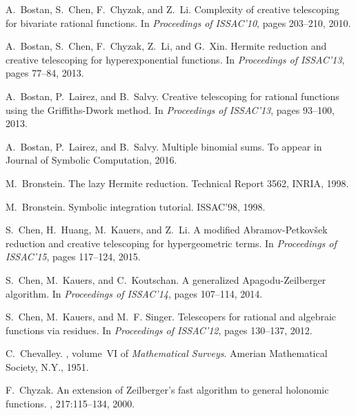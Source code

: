 \documentclass{sig-alternate-05-2015}
\begin{document}
\begin{thebibliography}{10}

A.~Bostan, S.~Chen, F.~Chyzak, and Z.~Li.
\newblock Complexity of creative telescoping for bivariate rational functions.
\newblock In {\em Proceedings of ISSAC'10}, pages 203--210, 2010.

A.~Bostan, S.~Chen, F.~Chyzak, Z.~Li, and G.~Xin.
\newblock Hermite reduction and creative telescoping for hyperexponential
  functions.
\newblock In {\em Proceedings of ISSAC'13}, pages 77--84, 2013.

A.~Bostan, P.~Lairez, and B.~Salvy.
\newblock Creative telescoping for rational functions using the
  {G}riffiths-{D}work method.
\newblock In {\em Proceedings of ISSAC'13}, pages 93--100, 2013.

A.~Bostan, P.~Lairez, and B.~Salvy.
\newblock Multiple binomial sums.
\newblock To appear in {J}ournal of {S}ymbolic {C}omputation, 2016.


M.~Bronstein.
\newblock The lazy {H}ermite reduction.
\newblock Technical Report 3562, INRIA, 1998.

M.~Bronstein.
\newblock Symbolic integration tutorial.
\newblock ISSAC'98, 1998.

S.~Chen, H.~Huang, M.~Kauers, and Z.~Li.
\newblock A modified {A}bramov-{P}etkov\v{s}ek reduction and creative
  telescoping for hypergeometric terms.
\newblock In {\em Proceedings of ISSAC'15}, pages 117--124, 2015.

 \vfill\eject
{}
S.~Chen, M.~Kauers, and C.~Koutschan.
\newblock A generalized {A}pagodu-{Z}eilberger algorithm.
\newblock In {\em Proceedings of ISSAC'14}, pages 107--114, 2014.

S.~Chen, M.~Kauers, and M.~F. Singer.
\newblock Telescopers for rational and algebraic functions via residues.
\newblock In {\em Proceedings of ISSAC'12}, pages 130--137, 2012.

C.~Chevalley.
, volume~VI of {\em Mathematical Surveys}.
\newblock Amerian Mathematical Society, N.Y., 1951.

F.~Chyzak.
\newblock An extension of {Z}eilberger's fast algorithm to general holonomic
  functions.
, 217:115--134, 2000.


\end{thebibliography}
\end{document}
